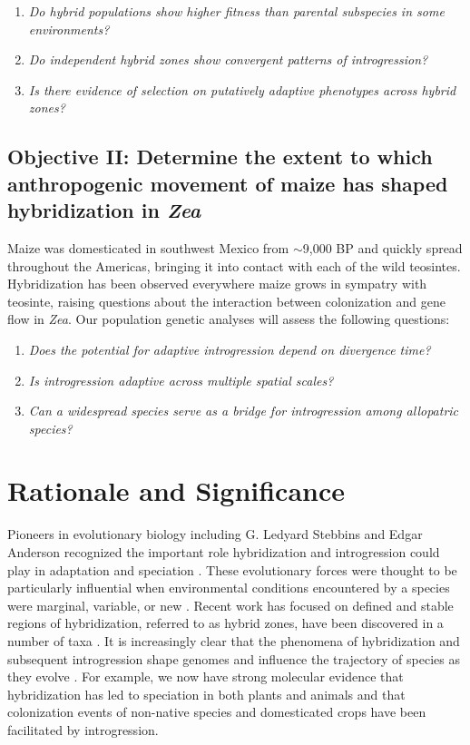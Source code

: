 \begin{enumerate}
\item \emph{Do hybrid populations show higher fitness than parental subspecies in some environments?}
\item \emph{Do independent hybrid zones show convergent patterns of introgression?}
\item \emph{Is there evidence of selection on putatively adaptive phenotypes across hybrid zones?}
\end{enumerate}

\subsection*{Objective II: Determine the extent to which anthropogenic movement of maize has shaped hybridization in \emph{Zea}}
Maize was domesticated in southwest Mexico from \zp{} $\sim$9,000 BP \citep{Matsuoka2002} and quickly spread throughout the Americas, bringing it into contact with each of the wild teosintes.
Hybridization has been observed everywhere maize grows in sympatry with teosinte, raising questions about the interaction between colonization and gene flow in \emph{Zea}.
Our population genetic analyses will assess the following questions:
\begin{enumerate}
\item \emph{Does the potential for adaptive introgression depend on divergence time?}
\item \emph{Is introgression adaptive across multiple spatial scales?}
\item \emph{Can a widespread species serve as a bridge for introgression among allopatric species?} 
\end{enumerate}

\section*{Rationale and Significance} 
Pioneers in evolutionary biology including G. Ledyard Stebbins and Edgar Anderson recognized the important role hybridization and introgression could play in adaptation and speciation \citep{Anderson1948, Anderson1954}.
These evolutionary forces were thought to be particularly influential when environmental conditions encountered by a species were marginal, variable, or new \citep{Stebbins1959}.
Recent work has focused on defined and stable regions of hybridization, referred to as hybrid zones, have been discovered in a number of taxa \citep[reviewed in ][]{HarrisonHybridZone, shurtliff2013, abbott2014}. 
It is increasingly clear that the phenomena of hybridization and subsequent introgression shape genomes and influence the trajectory of species as they evolve \citep{Ellstrand2014}.
For example, we now have strong molecular evidence that hybridization has led to speciation in both plants and animals \citep[reviewed in][]{mallet2007} and that colonization events of non-native species \citep{lucek2010} and domesticated crops \citep{he2011, Hufford2013} have been facilitated by introgression. 

